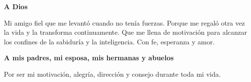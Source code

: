 \begin{dedicatoria}
    \par \textbf{A Dios}

     Mi amigo fiel que me levantó cuando no tenía fuerzas. Porque me regaló otra vez la vida y la transforma continuamente. Que me llena de motivación para alcanzar los confines de la sabiduría y la inteligencia. Con fe, esperanza y amor.

    \vspace*{5mm}

    \par \textbf{ A mis padres, mi esposa, mis hermanas y abuelos} 
    
    Por ser mi motivación, alegría, dirección y consejo durante toda mi vida.

\end{dedicatoria}